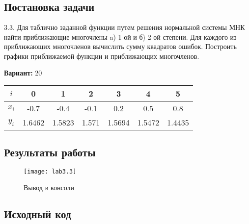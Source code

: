 \subsection{Постановка задачи}
3.3. Для таблично заданной функции путем решения нормальной системы МНК найти приближающие многочлены a) 1-ой  и б) 2-ой степени. Для каждого из приближающих многочленов вычислить сумму квадратов ошибок. Построить графики приближаемой функции и приближающих многочленов.

{\bfseries Вариант:} 20
    \begin{center}
        \begin{tabular}{ |c|c|c|c|c|c|c| } 
			 \hline
			 $i$ & 0 & 1 & 2 & 3 & 4 & 5 \\ 
			 \hline
			 $x_i$ & -0.7 & -0.4 & -0.1 & 0.2 & 0.5 & 0.8 \\ 
			 \hline
			 $y_i$ & 1.6462 & 1.5823 & 1.571 & 1.5694 & 1.5472 & 1.4435 \\ 
			 \hline
        \end{tabular}
    \end{center}
\pagebreak

\subsection{Результаты работы}
\begin{figure}[h!]
\centering
\texttt{[image: lab3.3]}
\caption{Вывод в консоли}
\end{figure}


\subsection{Исходный код}

\pagebreak